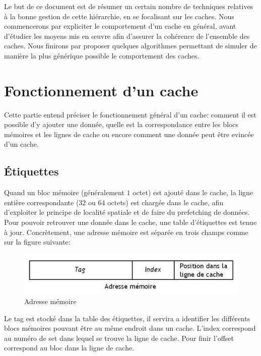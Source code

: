 \documentclass[a4paper]{article}
\begin{document}
\indent Le but de ce document est de résumer un certain nombre de techniques relatives à la bonne gestion de cette hiérarchie, en se focalisant sur les caches. Nous commencerons par expliciter le comportement d'un cache en général, avant d'étudier les moyens mis en {\oe}uvre afin d'assurer la cohérence de l'ensemble des caches. Nous finirons par proposer quelques algorithmes permettant de simuler de manière la plus générique possible le comportement des caches.

\newpage
\section{Fonctionnement d'un cache}
\indent Cette partie entend préciser le fonctionnement général d'un cache: comment il est possible d'y ajouter une donnée, quelle est la correspondance entre les blocs mémoires et les lignes de cache ou encore comment une donnée peut être evincée d'un cache.

\subsection{\'Etiquettes}
\indent Quand un bloc mémoire (généralement $1$ octet) est ajouté dans le cache, la ligne entière correspondante ($32$ ou $64$ octets) est chargée dans le cache, afin d'exploiter le principe de localité spatiale et de faire du prefetching de données. Pour pouvoir retrouver une donnée dans le cache, une table d'étiquettes est tenue à jour. Concrètement, une adresse mémoire est séparée en trois champs comme sur la figure suivante: \\

\begin{figure}[!h]
\begin{center}
   \includegraphics[scale=0.50]{etiquette.jpeg}
   \caption{\label{etiquette} Adresse mémoire}
\end{center}
\end{figure}

\indent Le tag est stocké dans la table des étiquettes, il servira a identifier les différents blocs mémoires pouvant être au même endroit dans un cache. L'index correspond au numéro de set dans lequel se trouve la ligne de cache. Pour finir l'offset correspond au bloc dans la ligne de cache.
\end{document}
